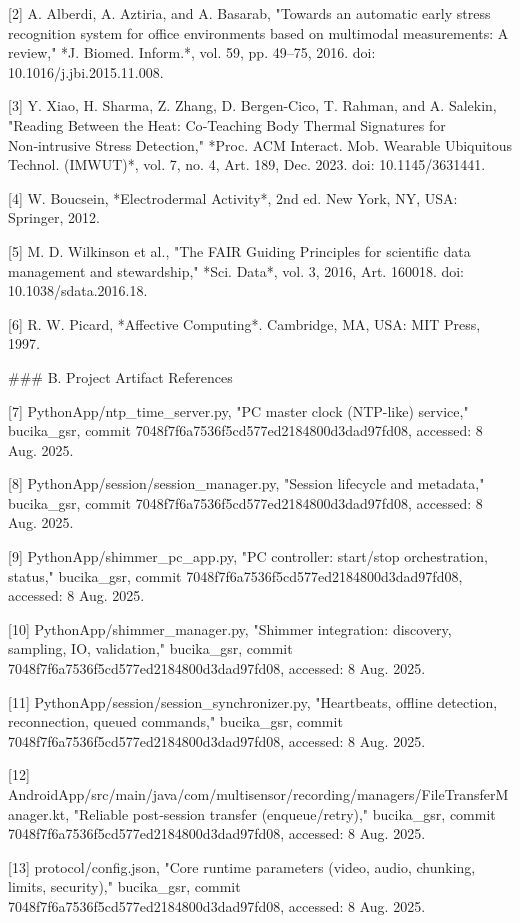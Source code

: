 \documentclass[12pt,a4paper]{article}
\begin{document}
{[2] A. Alberdi, A. Aztiria, and A. Basarab, "Towards an automatic early stress recognition system for office environments based on multimodal measurements: A review," *J. Biomed. Inform.*, vol. 59, pp. 49–75, 2016. doi: 10.1016/j.jbi.2015.11.008.

[3] Y. Xiao, H. Sharma, Z. Zhang, D. Bergen-Cico, T. Rahman, and A. Salekin, "Reading Between the Heat: Co‑Teaching Body Thermal Signatures for Non‑intrusive Stress Detection," *Proc. ACM Interact. Mob. Wearable Ubiquitous Technol. (IMWUT)*, vol. 7, no. 4, Art. 189, Dec. 2023. doi: 10.1145/3631441.

[4] W. Boucsein, *Electrodermal Activity*, 2nd ed. New York, NY, USA: Springer, 2012.

[5] M. D. Wilkinson et al., "The FAIR Guiding Principles for scientific data management and stewardship," *Sci. Data*, vol. 3, 2016, Art. 160018. doi: 10.1038/sdata.2016.18.

[6] R. W. Picard, *Affective Computing*. Cambridge, MA, USA: MIT Press, 1997.

### B. Project Artifact References

[7] PythonApp/ntp_time_server.py, "PC master clock (NTP-like) service," bucika_gsr, commit 7048f7f6a7536f5cd577ed2184800d3dad97fd08, accessed: 8 Aug. 2025.

[8] PythonApp/session/session_manager.py, "Session lifecycle and metadata," bucika_gsr, commit 7048f7f6a7536f5cd577ed2184800d3dad97fd08, accessed: 8 Aug. 2025.

[9] PythonApp/shimmer_pc_app.py, "PC controller: start/stop orchestration, status," bucika_gsr, commit 7048f7f6a7536f5cd577ed2184800d3dad97fd08, accessed: 8 Aug. 2025.

[10] PythonApp/shimmer_manager.py, "Shimmer integration: discovery, sampling, IO, validation," bucika_gsr, commit 7048f7f6a7536f5cd577ed2184800d3dad97fd08, accessed: 8 Aug. 2025.

[11] PythonApp/session/session_synchronizer.py, "Heartbeats, offline detection, reconnection, queued commands," bucika_gsr, commit 7048f7f6a7536f5cd577ed2184800d3dad97fd08, accessed: 8 Aug. 2025.

[12] AndroidApp/src/main/java/com/multisensor/recording/managers/FileTransferManager.kt, "Reliable post‑session transfer (enqueue/retry)," bucika_gsr, commit 7048f7f6a7536f5cd577ed2184800d3dad97fd08, accessed: 8 Aug. 2025.

[13] protocol/config.json, "Core runtime parameters (video, audio, chunking, limits, security)," bucika_gsr, commit 7048f7f6a7536f5cd577ed2184800d3dad97fd08, accessed: 8 Aug. 2025.

}
\end{document}
